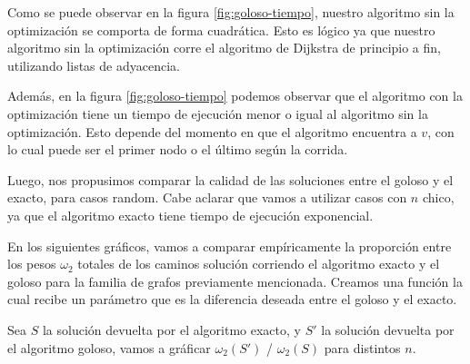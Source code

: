 Como se puede observar en la figura \ref{fig:goloso-tiempo}, nuestro algoritmo sin la optimización se comporta de forma cuadrática. Esto es lógico ya que nuestro algoritmo sin la optimización corre el algoritmo de Dijkstra de principio a fin, utilizando listas de adyacencia.

Además, en la figura \ref{fig:goloso-tiempo} podemos observar que el algoritmo con la optimización tiene un tiempo de ejecución menor o igual al algoritmo sin la optimización. Esto depende del momento en que el algoritmo encuentra a $v$, con lo cual puede ser el primer nodo o el último según la corrida.

Luego, nos propusimos comparar la calidad de las soluciones entre el goloso y el exacto, para casos random. Cabe aclarar que vamos a utilizar casos con $n$ chico, ya que el algoritmo exacto tiene tiempo de ejecución exponencial.



En los siguientes gráficos, vamos a comparar empíricamente la proporción entre los pesos $\omega_2$ totales de los caminos solución corriendo el algoritmo exacto y el goloso para la familia de grafos previamente mencionada. Creamos una función la cual recibe un parámetro que es la diferencia deseada entre el goloso y el exacto.

Sea $S$ la solución devuelta por el algoritmo exacto, y $S'$ la solución devuelta por el algoritmo goloso, vamos a gráficar $\omega_2(S')$ / $\omega_2(S)$ para distintos $n$.

